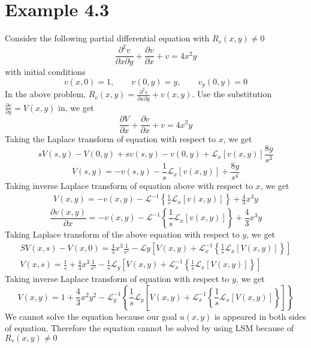 \documentclass[11pt]{report}
\newcommand{\Laplace}{\mathcal{L}}
\newcommand{\InverseLx}[1]{\Laplace^{-1}\left\{ #1 \right\}}
\newcommand{\InverseLxx}[1]{\Laplace^{-1}_x\left\{ #1 \right\}}
\newcommand{\InverseLyy}[1]{\Laplace^{-1}_y\left\{ #1 \right\}}
\newcommand{\sps}{\\[0.2cm]}
\newcommand{\dsp}{\displaystyle}
\begin{document}
	\section*{Example 4.3}
	Consider the following partial differential equation with $R_v(x,y) \neq 0$
	\begin{equation*}
		\frac{\partial^2 v}{\partial x \partial y} + \frac{\partial v}{\partial x} + v = 4x^2 y\label{eq:p_3_1}
	\end{equation*}
	with initial conditions
	\begin{equation*}
		v(x,0)=1,\qquad v(0,y)=y,\qquad v_y(0,y)=0\label{eq:p_3_2}
	\end{equation*}
	In the above problem, $\dsp R_v(x,y) = \frac{\partial^2 v}{\partial x \partial y} + v(x,y)$. Use the substitution $\dsp \frac{\partial v}{\partial y}= V(x,y)$ in, we get
	\begin{equation*}
		\frac{\partial V}{\partial x} + \frac{\partial v}{\partial x} + v = 4x^2 y\label{eq:p_3_3}
	\end{equation*}
	Taking the Laplace transform of equation with respect to $x$, we get
	\begin{equation*}
		sV(s,y) - V(0,y) + sv(s,y) - v(0,y) + \Laplace_x\left[v(x,y)\right]\frac{8y}{s^3} 
	\end{equation*}
	\begin{equation*}
		V(s,y) = -v(s,y) - \frac{1}{s}\Laplace_x\left[v(x,y)\right]+ \frac{8y}{s^4}\label{eq:p_3_4}
	\end{equation*}
	Taking inverse Laplace transform of equation above with respect to $x$, we get 
	\begin{eqnarray*}
		V(x,y) = -v(x,y) - \InverseLx{\frac{1}{s}\Laplace_x\left[v(x,y)\right]} + \frac{4}{3}x^3y
	\end{eqnarray*}
	\begin{equation*}
		\frac{\partial v(x,y)}{\partial x} = - v(x,y) - \InverseLx{\frac{1}{s}\Laplace_x\left[v(x,y)\right]}+\frac{4}{3}x^3y\label{eq:p_3_5}
	\end{equation*}
	Taking Laplace transform of the above equation with respect to $y$, we get
	\begin{eqnarray*}
		SV(x,s) - V(x,0) = \frac{4}{3}x^3\frac{1}{s^2}-\Laplace y\left[ V(x,y) + \InverseLxx{\frac{1}{s}\Laplace_x[V(x,y)]} \right]\sps
		V(x,s) = \frac{1}{s} + \frac{4}{3}x^3\frac{1}{s^3} - \frac{1}{s}\Laplace_y\left[ V(x,y) + \InverseLxx{\frac{1}{s}\Laplace_x[V(x,y)]}  \right]
	\end{eqnarray*}
	Taking inverse Laplace transform of equation  with respect to $y$, we get
	\begin{equation*}
		V(x,y) = 1 + \frac{4}{3}x^2y^2 - \InverseLyy{\frac{1}{s}\Laplace_y[V(x,y) + \InverseLxx{\frac{1}{s}\Laplace_x[V(x,y)]}]}
	\end{equation*}
	We cannot solve the equation because our goal $u(x,y)$ is appeared in both sides of equation. Therefore the equation cannot be solved by using LSM because of $R_v(x,y) \neq 0$
\end{document}
